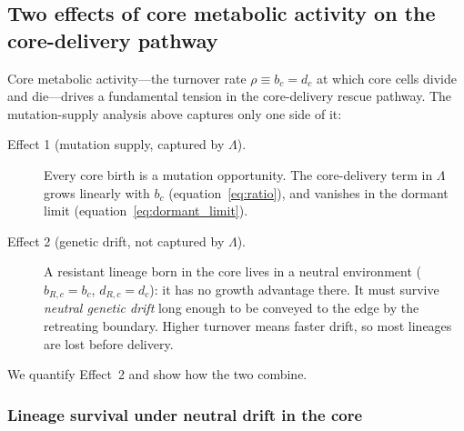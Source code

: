 \documentclass[12pt]{article}
\newcommand{\bCore}{b_c}
\newcommand{\dCore}{d_c}
\begin{document}
\subsection{Two effects of core metabolic activity on the core-delivery pathway}
\label{sec:turnover}

Core metabolic activity---the turnover rate $\rho \equiv \bCore = \dCore$
at which core cells divide and die---drives a fundamental tension in the
core-delivery rescue pathway. The mutation-supply analysis above captures
only one side of it:

\begin{description}
    \item[Effect 1 (mutation supply, captured by $\Lambda$).]
    Every core birth is a mutation opportunity. The core-delivery term in
    $\Lambda$ grows linearly with $\bCore$ (equation~\eqref{eq:ratio}),
    and vanishes in the dormant limit (equation~\eqref{eq:dormant_limit}).

    \item[Effect 2 (genetic drift, not captured by $\Lambda$).]
    A resistant lineage born in the core lives in a neutral environment
    ($b_{R,c} = \bCore$, $d_{R,c} = \dCore$): it has no growth advantage
    there. It must survive \emph{neutral genetic drift} long enough to be
    conveyed to the edge by the retreating boundary. Higher turnover means
    faster drift, so most lineages are lost before delivery.
\end{description}

We quantify Effect~2 and show how the two combine.

\subsubsection*{Lineage survival under neutral drift in the core}
\end{document}
